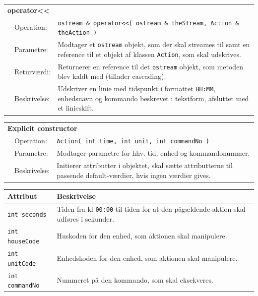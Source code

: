 \begin{table}[h] 
\begin{tabularx}{\textwidth}{p{0.6 cm} l X} %
\multicolumn{3}{l}{\textbf{operator{<}{<}}}\\
& Operation: & %
\texttt{ostream \& operator{<}{<}( ostream \& theStream, Action \& theAction ) }
\\ & Parametre: & %
Modtager et \texttt{ostream} objekt, som der skal streames til samt en reference til et objekt af klassen \texttt{Action}, som skal udskrives.
\\ & Returværdi: & %
Returnerer en reference til det \texttt{ostream} objekt, som metoden blev kaldt med (tillader cascading).
\\ & Beskrivelse: & %
Udskriver en linie med tidspunkt i formattet \texttt{HH:MM}, enhedsnavn og kommando beskrevet i tekstform, afsluttet med et linieskift.
\\ \end{tabularx}
\end{table}

\begin{table}[h] 
\begin{tabularx}{\textwidth}{p{0.6 cm} l X} %
\multicolumn{3}{l}{\textbf{Explicit constructor}}\\
& Operation: & %
\texttt{Action( int time, int unit,  int commandNo ) }
\\ & Parametre: & %
Modtager parametre for hhv. tid, enhed og kommandonummer.
\\ & Beskrivelse: & %
Initierer attributter i objektet, skal sætte attributterne til passende default-værdier, hvis ingen værdier gives.
\\ \end{tabularx}
\end{table}

\begin{table}[h]
\centering
\begin{tabularx}{13 cm}{|l |X|} \hline
Attribut & Beskrivelse \\ \hline
\texttt{int seconds} & Tiden fra kl \texttt{00:00} til tiden for at den pågældende aktion skal udføres i sekunder. \\ \hline
\texttt{int houseCode} & Huskoden for den enhed, som aktionen skal manipulere. \\ \hline
\texttt{int unitCode} & Enhedskoden for den enhed, som aktionen skal manipulere. \\ \hline
\texttt{int commandNo} & Nummeret på den kommando, som skal eksekveres. \\ \hline
\end{tabularx}
\end{table}

